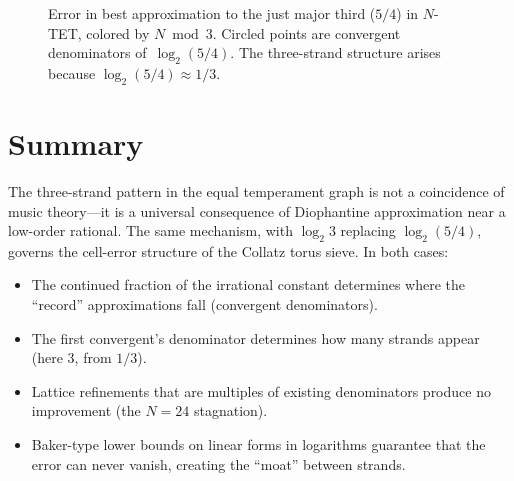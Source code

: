 \documentclass[12pt]{article}
\theoremstyle{plain}
\theoremstyle{definition}
\theoremstyle{remark}
\numberwithin{equation}{section}
\begin{document}
\begin{figure}[ht]
\caption{Error in best approximation to the just major third
  ($5/4$) in $N$-TET, colored by $N \bmod 3$.
  Circled points are convergent denominators of~$\log_2(5/4)$.
  The three-strand structure arises because
  $\log_2(5/4) \approx 1/3$.}
\label{fig:strands}
\end{figure}

\section{Summary}
\label{sec:summary}

The three-strand pattern in the equal temperament graph is not a
coincidence of music theory---it is a universal consequence of
Diophantine approximation near a low-order rational.  The same
mechanism, with $\log_2 3$ replacing $\log_2(5/4)$, governs the
cell-error structure of the Collatz torus sieve.  In both cases:

\begin{itemize}
\item The continued fraction of the irrational constant determines
  where the ``record'' approximations fall (convergent denominators).
\item The first convergent's denominator determines how many strands
  appear (here $3$, from $1/3$).
\item Lattice refinements that are multiples of existing denominators
  produce no improvement (the $N=24$ stagnation).
\item Baker-type lower bounds on linear forms in logarithms guarantee
  that the error can never vanish, creating the ``moat'' between strands.
\end{itemize}
\end{document}
